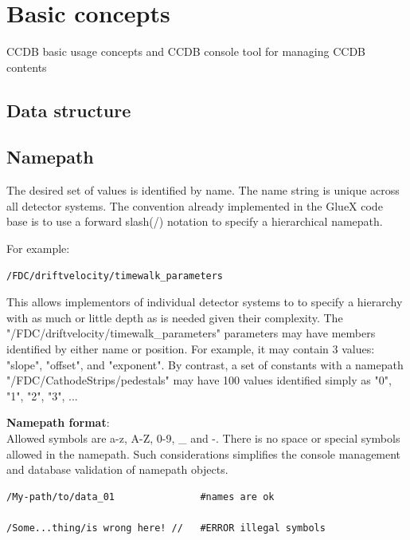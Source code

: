\documentclass{article}
\begin{document}
\newpage
\section{Basic concepts}\label{sec:basic_concepts}

CCDB basic usage concepts and CCDB console tool for managing CCDB contents


\subsection{Data structure}


\subsection{Namepath}
The desired set of values is identified by name. The name string is unique
across all detector systems. The convention already implemented in the GlueX
code base is to use a forward slash(/) notation to specify a hierarchical
namepath.

For example:
\begin{verbatim}
/FDC/driftvelocity/timewalk_parameters
\end{verbatim}

This allows implementors of individual detector systems to to specify a
hierarchy with as much or little depth as is needed given their complexity.
The "/FDC/driftvelocity/timewalk\_parameters" parameters may have members
identified by either name or position. For example, it may contain 3 values:
"slope", "offset", and "exponent". By contrast, a set of constants with a
namepath "/FDC/CathodeStrips/pedestals" may have 100 values identified simply
as "0", "1", "2", "3", ...

\textbf{Namepath format}:\\
Allowed symbols are a-z, A-Z, 0-9, \_ and -. There is no space or special symbols
allowed in the namepath. Such considerations simplifies the console management
and database validation of namepath objects.
\begin{verbatim}
/My-path/to/data_01               #names are ok

/Some...thing/is wrong here! //   #ERROR illegal symbols

\end{verbatim}
\end{document}
